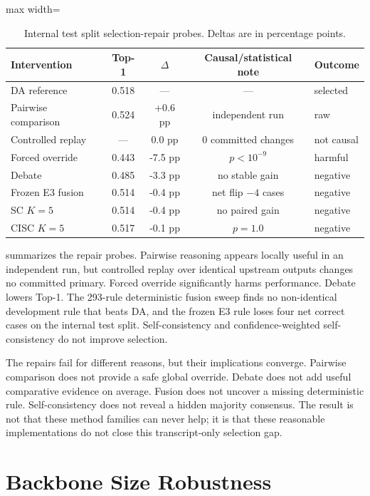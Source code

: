\begin{table}[htbp]
\centering
\caption{Internal test split selection-repair probes. Deltas are in percentage points.}
\label{tab:repair-battery-rewrite}
\begin{adjustbox}{max width=\textwidth}
\begin{tabular}{lcccl}
\toprule
Intervention & Top-1 & $\Delta$ & Causal/statistical note & Outcome\\
\midrule
DA reference & 0.518 & --- & --- & selected\\
Pairwise comparison & 0.524 & +0.6 pp & independent run & raw\\
Controlled replay & --- & 0.0 pp & 0 committed changes & not causal\\
Forced override & 0.443 & -7.5 pp & $p<10^{-9}$ & harmful\\
Debate & 0.485 & -3.3 pp & no stable gain & negative\\
Frozen E3 fusion & 0.514 & -0.4 pp & net flip $-4$ cases & negative\\
SC $K=5$ & 0.514 & -0.4 pp & no paired gain & negative\\
CISC $K=5$ & 0.517 & -0.1 pp & $p=1.0$ & negative\\
\bottomrule
\end{tabular}
\end{adjustbox}
\end{table}

 summarizes the repair probes. Pairwise reasoning appears locally useful in an independent run, but controlled replay over identical upstream outputs changes no committed primary. Forced override significantly harms performance. Debate lowers Top-1. The 293-rule deterministic fusion sweep finds no non-identical development rule that beats DA, and the frozen E3 rule loses four net correct cases on the internal test split. Self-consistency and confidence-weighted self-consistency do not improve selection.

The repairs fail for different reasons, but their implications converge. Pairwise comparison does not provide a safe global override. Debate does not add useful comparative evidence on average. Fusion does not uncover a missing deterministic rule. Self-consistency does not reveal a hidden majority consensus. The result is not that these method families can never help; it is that these reasonable implementations do not close this transcript-only selection gap.

\section{Backbone Size Robustness}

